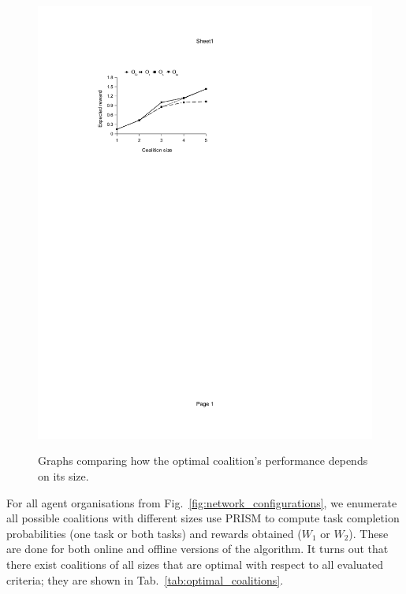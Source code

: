 \documentclass{llncs}
\begin{document}
\begin{figure}[h]
{\includegraphics[clip=true, trim=101 520 280 115, scale=0.65]{images/w2_stpg_online}
}
\caption{Graphs comparing how the optimal coalition's performance depends on its size.
}
\label{fig:coalition_performance}
\end{figure}
%
For all agent organisations from Fig.~\ref{fig:network_configurations}, we enumerate all possible coalitions with different sizes use PRISM to compute task completion probabilities (one task or both tasks) and rewards obtained ($W_1$ or $W_2$). These are done for both online and offline versions of the algorithm. It turns out that there exist coalitions of all sizes that are optimal with respect to all evaluated criteria; they are shown in Tab.~\ref{tab:optimal_coalitions}.
\end{document}
